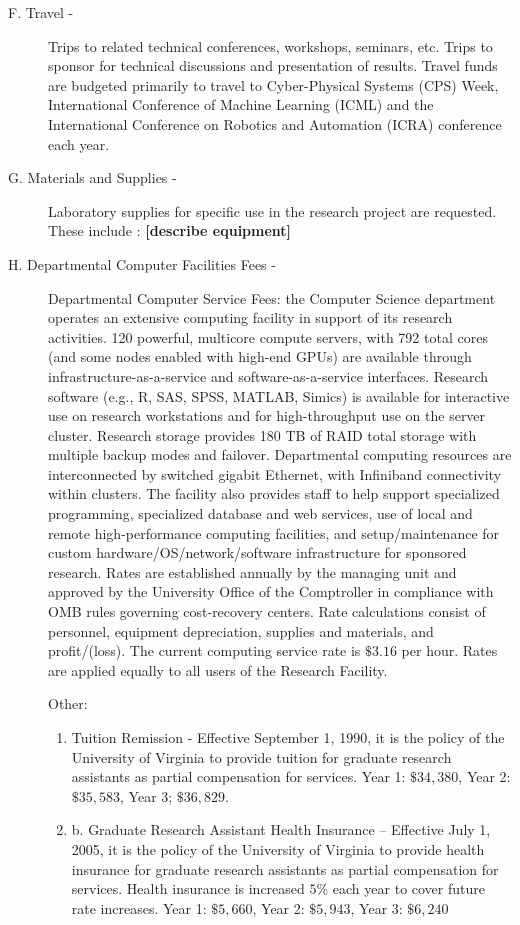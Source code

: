 \begin{description}
\item[F. Travel - ]

Trips to related technical conferences, workshops, seminars, etc.  Trips to sponsor for technical discussions and presentation of results. Travel funds are budgeted primarily to travel to Cyber-Physical Systems (CPS) Week, International Conference of Machine Learning (ICML) and the International Conference on Robotics and Automation  (ICRA) conference each year. 

\item[G. Materials and Supplies - ]

Laboratory supplies for specific use in the research project are requested. These include : \textbf{[describe equipment]}

\item[H. Departmental Computer Facilities Fees -]

Departmental Computer Service Fees: the Computer Science department operates an extensive computing facility in support of its research activities.  120 powerful, multicore compute servers, with 792 total cores (and some nodes enabled with high-end GPUs) are available through infrastructure-as-a-service and software-as-a-service interfaces.  Research software (e.g., R, SAS, SPSS, MATLAB, Simics) is available for interactive use on research workstations and for high-throughput use on the server cluster.  Research storage provides 180 TB of RAID total storage with multiple backup modes and failover.  Departmental computing resources are interconnected by switched gigabit Ethernet, with Infiniband connectivity within clusters.  The facility also provides staff to help support specialized programming, specialized database and web services, use of local and remote high-performance computing facilities, and setup/maintenance for custom hardware/OS/network/software infrastructure for sponsored research.  Rates are established annually by the managing unit and approved by the University Office of the Comptroller in compliance with OMB rules governing cost-recovery centers.  Rate calculations consist of personnel, equipment depreciation, supplies and materials, and profit/(loss).  The current computing service rate is $\$3.16$ per hour.  Rates are applied equally to all users of the Research Facility.

Other:
\begin{enumerate}
    \item Tuition Remission - Effective September 1, 1990, it is the policy of the University of Virginia to provide tuition for graduate research assistants as partial compensation for services.  Year 1: $\$34,380$, Year 2: $\$35,583$, Year 3; $\$36,829$.
    \item b.	Graduate Research Assistant Health Insurance – Effective July 1, 2005, it is the policy of the University of Virginia to provide health insurance for graduate research assistants as partial compensation for services.  Health insurance is increased $5\%$ each year to cover future rate increases. Year 1: $\$5,660$, Year 2: $\$5,943$, Year 3: $\$6,240$
\end{enumerate}


\end{description}
